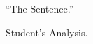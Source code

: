 
\date{Admiralty Law -- DD MON YYYY}


\begin{flushleft}
\thetitle

\thedate

\theauthor
\end{flushleft}

``The Sentence.''  %

Student's Analysis.

